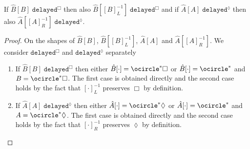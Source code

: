 \begin{lemma}
If $\hat{B}[B]\;\texttt{delayed}^\Box$ then also $\hat{B}[[B]^{-1}_L]\;\texttt{delayed}^\Box$ and if $\hat{A}[A]\;\texttt{delayed}^\lozenge$ then also $\hat{A}[[A]^{-1}_R]\;\texttt{delayed}^\lozenge$.
\begin{proof}
On the shapes of $\hat{B}[B]$, $\hat{B}[[B]^{-1}_L]$, $\hat{A}[A]$ and $\hat{A}[[A]^{-1}_R]$. We consider $\texttt{delayed}^\Box$ and $\texttt{delayed}^\lozenge$ separately
\begin{enumerate}
    \item If $\hat{B}[B]\;\texttt{delayed}^\Box$ then either $\hat{B}[\cdot]=\ocircle^*\Box$ or $\hat{B}[\cdot]=\ocircle^*$ and $B=\ocircle^*\Box$. The first case is obtained directly and the second case holds by the fact that $[\cdot]^{-1}_L$ preserves $\Box$ by definition.
    
    \item If $\hat{A}[A]\;\texttt{delayed}^\lozenge$ then either $\hat{A}[\cdot]=\ocircle^*\lozenge$ or $\hat{A}[\cdot]=\ocircle^*$ and $A=\ocircle^*\lozenge$. The first case is obtained directly and the second case holds by the fact that $[\cdot]^{-1}_R$ preserves $\lozenge$ by definition.
    
\end{enumerate}
\end{proof}
\end{lemma}


    


